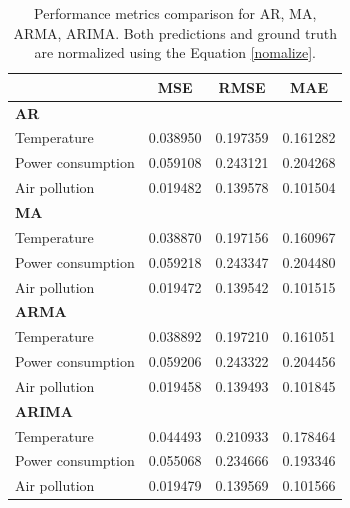 \documentclass[sn-mathphys-num]{sn-jnl}
\theoremstyle{thmstyleone}%
\theoremstyle{thmstyletwo}%
\theoremstyle{thmstylethree}%
\begin{document}
\begin{table}[]
\centering
\begin{tabular}{@{}lccc@{}}
\toprule
\textbf{}               & \hspace{0.6cm} \textbf{MSE} & \textbf{RMSE} & \textbf{MAE} \\ \midrule
\textbf{AR}             &              &               &              \\
Temperature             & \hspace{0.6cm}  0.038950     & \hspace{1cm} 0.197359      \hspace{1cm} & 0.161282     \\
Power consumption       & \hspace{0.6cm} 0.059108     & 0.243121      & 0.204268     \\
Air pollution           & \hspace{0.6cm} 0.019482     & 0.139578      & 0.101504     \\ \midrule
\textbf{MA}             &              &               &              \\
Temperature             & \hspace{0.6cm} 0.038870     & 0.197156      & 0.160967    \\
Power consumption       & \hspace{0.6cm} 0.059218     & 0.243347      & 0.204480     \\
Air pollution           & \hspace{0.6cm} 0.019472     & 0.139542      & 0.101515     \\ \midrule
\textbf{ARMA}           &              &               &              \\
Temperature             & \hspace{0.6cm} 0.038892     & 0.197210      & 0.161051     \\
Power consumption       & \hspace{0.6cm} 0.059206     & 0.243322      & 0.204456     \\
Air pollution           & \hspace{0.6cm} 0.019458     & 0.139493      & 0.101845      \\ \midrule
\textbf{ARIMA}          &              &               &              \\
Temperature             & \hspace{0.6cm} 0.044493     & 0.210933      & 0.178464     \\
Power consumption       & \hspace{0.6cm} 0.055068     & 0.234666      & 0.193346     \\
Air pollution           & \hspace{0.6cm} 0.019479     & 0.139569      & 0.101566       \\ \bottomrule
\end{tabular}
\caption{Performance metrics comparison for AR, MA, ARMA, ARIMA. Both predictions and ground truth are normalized using the Equation \ref{nomalize}.}
\label{tab:classical_metric}
\end{table}
\end{document}
